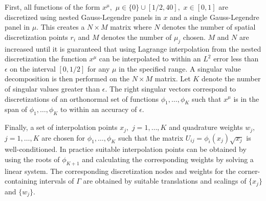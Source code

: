 First, all functions of the form $x^\mu,$ $\mu \in \{0\} \cup [1/2,40],$ $x \in [0,1]$ are discretized using nested Gauss-Legendre panels in $x$ and a single Gauss-Legendre panel in $\mu$. This creates a $N \times M$ matrix where $N$ denotes the number of spatial discretization points $r_i$ and $M$ denotes the number of $\mu_j$ chosen. $M$ and $N$ are increased until it is guaranteed that using Lagrange interpolation from the nested discretization the function $x^\mu$ can be interpolated to within an $L^2$ error less than $\epsilon$ on the interval $[0,1/2]$ for any $\mu$ in the specified range. A singular value decomposition is then performed on the $N\times M$ matrix. Let $K$ denote the number of singular values greater than $\epsilon.$ The right singular vectors correspond to discretizations of an orthonormal set of functions $\phi_1,\dots,\phi_K$ such that $x^\mu$ is in the span of $\phi_1,\dots,\phi_K$ to within an accuracy of $\epsilon.$

Finally, a set of interpolation points $x_j,$ $j=1,\dots,K$ and quadrature weights $w_j,$ $j=1,\dots,K$ are chosen for $\phi_1,\dots,\phi_K$ such that the matrix $U_{ij} = \phi_i(x_j) \sqrt{x_j}$ is well-conditioned. In practice suitable interpolation points can be obtained by using the roots of $\phi_{K+1}$ and calculating the corresponding weights by solving a linear system. The corresponding discretization nodes and weights for the corner-containing intervals of $\Gamma$ are obtained by suitable translations and scalings of $\{x_j\}$ and $\{w_j\}.$


